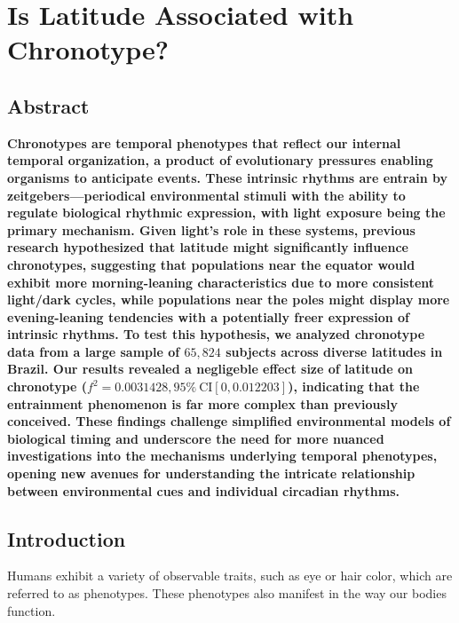 \documentclass[
12pt,
openright,
oneside,
a4paper,
chapter=TITLE,
section=TITLE,
french,
spanish,
brazil,
english
]{abntex2}
\newlength{\hugeskipamount}
\begin{document}
\vspace{\hugeskipamount}


\chapter{Is Latitude Associated with
Chronotype?}\label{sec-latitude-hypothesis-article}

\section{Abstract}\label{abstract}

\noindent \textbf{Chronotypes are temporal phenotypes that reflect our
internal temporal organization, a product of evolutionary pressures
enabling organisms to anticipate events. These intrinsic rhythms are
entrain by zeitgebers---periodical environmental stimuli with the
ability to regulate biological rhythmic expression, with light exposure
being the primary mechanism. Given light's role in these systems,
previous research hypothesized that latitude might significantly
influence chronotypes, suggesting that populations near the equator
would exhibit more morning-leaning characteristics due to more
consistent light/dark cycles, while populations near the poles might
display more evening-leaning tendencies with a potentially freer
expression of intrinsic rhythms. To test this hypothesis, we analyzed
chronotype data from a large sample of \(65,824\) subjects across
diverse latitudes in Brazil. Our results revealed a negligeble effect
size of latitude on chronotype
(\(f^2 = 0.0031428, 95\% \ \text{CI}[0, 0.012203]\)), indicating that
the entrainment phenomenon is far more complex than previously
conceived. These findings challenge simplified environmental models of
biological timing and underscore the need for more nuanced
investigations into the mechanisms underlying temporal phenotypes,
opening new avenues for understanding the intricate relationship between
environmental cues and individual circadian rhythms.}

\section{Introduction}\label{introduction}

Humans exhibit a variety of observable traits, such as eye or hair
color, which are referred to as phenotypes. These phenotypes also
manifest in the way our bodies function.
\end{document}

